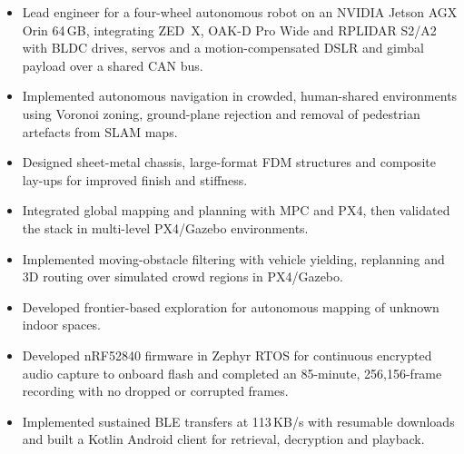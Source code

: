 \documentclass[11pt,letterpaper]{article}
\newcommand{\cvblock}[1]{\vspace{4pt}{\bfseries\itshape #1}\par\vspace{1pt}}
\newenvironment{cvlist}
  {\begin{itemize}[leftmargin=1.1em,itemsep=1pt,parsep=0pt,topsep=1.5pt,
                   label=\textendash]}
  {\end{itemize}}
\begin{document}
\cvblock{Autonomous ground platform for perception, planning and hardware}
\begin{cvlist}
  \item Lead engineer for a four-wheel autonomous robot on an NVIDIA Jetson AGX
        Orin 64\,GB, integrating ZED~X, OAK-D Pro Wide and RPLIDAR S2/A2 with BLDC
        drives, servos and a motion-compensated DSLR and gimbal payload over a
        shared CAN bus.
  \item Implemented autonomous navigation in crowded, human-shared environments
        using Voronoi zoning, ground-plane rejection and removal of pedestrian
        artefacts from SLAM maps.
  \item Designed sheet-metal chassis, large-format FDM structures and composite
        lay-ups for improved finish and stiffness.
\end{cvlist}

\cvblock{Aerial autonomy stack for predictive control, planning and dynamic environments}
\begin{cvlist}
  \item Integrated global mapping and planning with MPC and PX4, then validated
        the stack in multi-level PX4/Gazebo environments.
  \item Implemented moving-obstacle filtering with vehicle yielding, replanning
        and 3D routing over simulated crowd regions in PX4/Gazebo.
  \item Developed frontier-based exploration for autonomous mapping of unknown
        indoor spaces.
\end{cvlist}

\cvblock{Embedded wireless audio system development}
\begin{cvlist}
  \item Developed nRF52840 firmware in Zephyr RTOS for continuous encrypted
        audio capture to onboard flash and completed an 85-minute, 256{,}156-frame
        recording with no dropped or corrupted frames.
  \item Implemented sustained BLE transfers at 113\,KB/s with resumable
        downloads and built a Kotlin Android client for retrieval, decryption
        and playback.
\end{cvlist}
\end{document}

